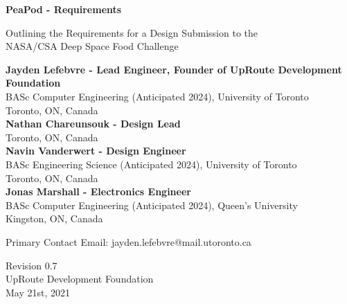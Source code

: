 \documentclass{report}
\begin{document}
\begin{titlepage}
    \begin{center}
        \vspace*{1.2cm}

        \textbf{\large{PeaPod - Requirements}}

        \vspace{0.5cm}

        Outlining the Requirements for a Design Submission to the \\NASA/CSA Deep Space Food Challenge

        \vfill \small{

            \textbf{Jayden Lefebvre - Lead Engineer, Founder of UpRoute Development Foundation}\\
            BASc Computer Engineering (Anticipated 2024), University of Toronto\\
            Toronto, ON, Canada\\
            \vspace{.5cm}
            \textbf{Nathan Chareunsouk - Design Lead}\\Toronto, ON, Canada\\
            \vspace{.5cm}
            \textbf{Navin Vanderwert - Design Engineer}\\
            BASc Engineering Science (Anticipated 2024), University of Toronto\\
            Toronto, ON, Canada\\
            \vspace{.5cm}
            \textbf{Jonas Marshall - Electronics Engineer}\\
            BASc Computer Engineering (Anticipated 2024), Queen's University\\
            Kingston, ON, Canada

        }

        \vspace{1cm}

        Primary Contact Email: jayden.lefebvre@mail.utoronto.ca

        \vspace{.75cm}

        Revision 0.7\\
        UpRoute Development Foundation\\
        May 21st, 2021

    \end{center}
\end{titlepage}
\end{document}
